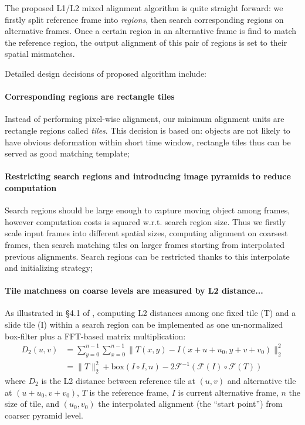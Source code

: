 \documentclass[conference, 10pt]{IEEEtran}
\begin{document}
The proposed L1/L2 mixed alignment algorithm is quite straight forward: we firstly split
reference frame into \emph{regions}, then search corresponding regions on alternative
frames. Once a certain region in an alternative frame is find to match the reference region,
the output alignment of this pair of regions is set to their spatial mismatches.

Detailed design decisions of proposed algorithm include:

\paragraph{Corresponding regions are rectangle tiles} Instead of performing pixel-wise
alignment, our minimum alignment units are rectangle regions called \emph{tiles}.
This decision is based on: objects are not likely to have obvious deformation within short time
window, rectangle tiles thus can be served as good matching template;

\paragraph{Restricting search regions and introducing image pyramids to reduce computation}
Search regions should be large enough to capture moving object among frames, however computation
costs is squared w.r.t. search region size. Thus we firstly scale input frames into different
spatial sizes, computing alignment on coarsest frames, then search matching tiles on
larger frames starting from interpolated previous alignments. Search regions can be restricted
thanks to this interpolate and initializing strategy;

\paragraph{Tile matchness on coarse levels are measured by L2 distance...} 
As illustrated in \S 4.1 of \cite{hasinoff2016burst}, computing
L2 distances among one fixed tile (T) and a slide tile (I) within a search region can be implemented
as one un-normalized box-filter plus a FFT-based matrix multiplication:
\begin{align*}
    D_2(u, v) &= \sum_{y=0}^{n-1} \sum_{x=0}^{n-1} \| T(x, y) - I(x + u + u_0, y + v + v_0) \|_2^2 \\
              &= \| T \|_2^2 + \mathrm{box}(I \circ I, n) - 2\mathcal{F}^{-1}(\mathcal{F}(I) \circ \mathcal{F}(T))
\end{align*}
where $D_2$ is the L2 distance between reference tile at $(u, v)$ and alternative tile at $(u + u_0, v + v_0)$,
$T$ is the reference frame, $I$ is current alternative frame, $n$ the size of tile,
and $(u_0, v_0)$ the interpolated alignment (the ``start point'') from coarser pyramid level.
\end{document}
